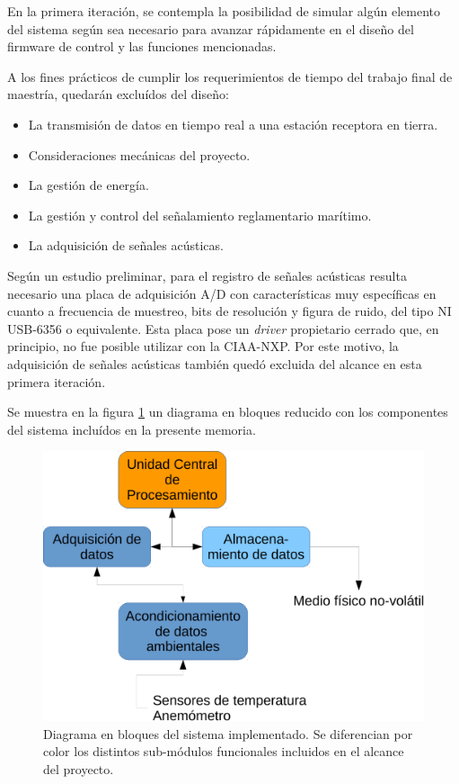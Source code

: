 En la primera iteración, se contempla la posibilidad de simular algún elemento del sistema según sea necesario para avanzar rápidamente en el diseño del firmware de control y las funciones mencionadas. 

A los fines prácticos de cumplir los requerimientos de tiempo del trabajo final de maestría, quedarán excluídos del diseño:

\begin{itemize}
	\item La transmisión de datos en tiempo real a una estación receptora en tierra.
	\item Consideraciones mecánicas del proyecto.
	\item La gestión de energía.
	\item La gestión y control del señalamiento reglamentario marítimo.
	\item La adquisición de señales acústicas.
\end{itemize}

Según un estudio preliminar, para el registro de señales acústicas resulta necesario una placa de adquisición A/D con características muy específicas en cuanto a frecuencia de muestreo, bits de resolución y figura de ruido, del tipo NI USB-6356 \cite{ni6356} o equivalente.  Esta placa pose un \textit{driver} propietario cerrado que, en principio, no fue posible utilizar con la CIAA-NXP.   Por este motivo, la adquisición de señales acústicas también quedó excluida del alcance en esta primera iteración.

Se muestra en la figura \ref{fig:diagramaBloquesReducido} un diagrama en bloques reducido con los componentes del sistema incluídos en la presente memoria.

\begin{figure}[ht]
  \centering
	\includegraphics[width=.75\textwidth]{./Figures/Diagrama_en_Bloques_reducido.pdf}
	\caption[Diagrama en bloques implementado]{Diagrama en bloques del sistema implementado. Se diferencian por color los distintos sub-módulos funcionales incluidos en el alcance del proyecto.}
	\label{fig:diagramaBloquesReducido}
\end{figure}





